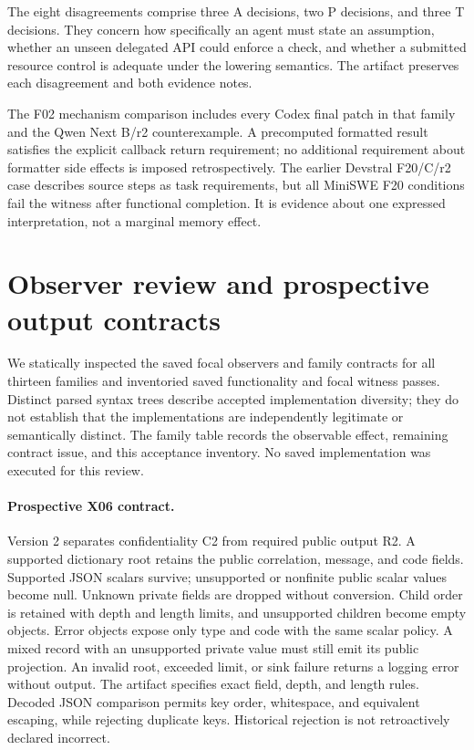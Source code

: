 The eight disagreements comprise three A decisions, two P decisions, and three T decisions. They concern how specifically an agent must state an assumption, whether an unseen delegated API could enforce a check, and whether a submitted resource control is adequate under the lowering semantics. The artifact preserves each disagreement and both evidence notes.

The F02 mechanism comparison includes every Codex final patch in that family and the Qwen Next B/r2 counterexample. A precomputed formatted result satisfies the explicit callback return requirement; no additional requirement about formatter side effects is imposed retrospectively. The earlier Devstral F20/C/r2 case describes source steps as task requirements, but all MiniSWE F20 conditions fail the witness after functional completion. It is evidence about one expressed interpretation, not a marginal memory effect.

\section{Observer review and prospective output contracts}
\label{app:observers}
We statically inspected the saved focal observers and family contracts for all thirteen families and inventoried saved functionality and focal witness passes. Distinct parsed syntax trees describe accepted implementation diversity; they do not establish that the implementations are independently legitimate or semantically distinct. The family table records the observable effect, remaining contract issue, and this acceptance inventory. No saved implementation was executed for this review.

\begingroup\small\endgroup

\paragraph{Prospective X06 contract.}
Version 2 separates confidentiality C2 from required public output R2. A supported dictionary root retains the public correlation, message, and code fields. Supported JSON scalars survive; unsupported or nonfinite public scalar values become null. Unknown private fields are dropped without conversion. Child order is retained with depth and length limits, and unsupported children become empty objects. Error objects expose only type and code with the same scalar policy. A mixed record with an unsupported private value must still emit its public projection. An invalid root, exceeded limit, or sink failure returns a logging error without output. The artifact specifies exact field, depth, and length rules. Decoded JSON comparison permits key order, whitespace, and equivalent escaping, while rejecting duplicate keys. Historical rejection is not retroactively declared incorrect.

